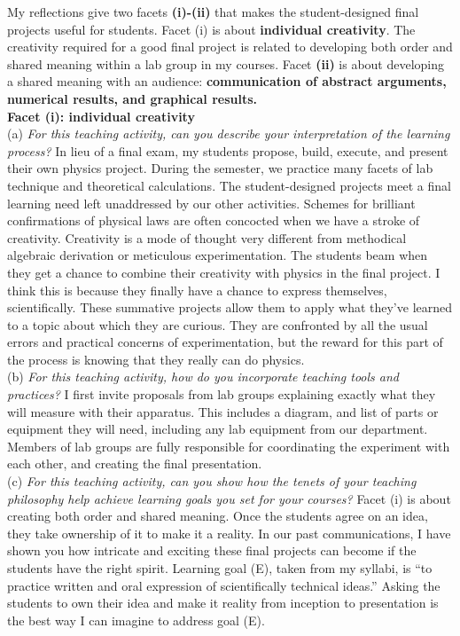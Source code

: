 \documentclass[../../../main.tex]{subfiles}
\begin{document}
My reflections give two facets \textbf{(i)-(ii)} that makes the student-designed final projects useful for students.  Facet (i) is about \textbf{individual creativity}.  The creativity required for a good final project is related to developing both order and shared meaning within a lab group in my courses.  Facet \textbf{(ii)} is about developing a shared meaning with an audience: \textbf{communication of abstract arguments, numerical results, and graphical results.}
\\
\vspace{0.25cm}
\textbf{Facet (i): individual creativity}
\\
\vspace{0.25cm}
(a) \textit{For this teaching activity, can you describe your interpretation of the learning process?} In lieu of a final exam, my students propose, build, execute, and present their own physics project.  During the semester, we practice many facets of lab technique and theoretical calculations.  The student-designed projects meet a final learning need left unaddressed by our other activities.  Schemes for brilliant confirmations of physical laws are often concocted when we have a stroke of creativity. Creativity is a mode of thought very different from methodical algebraic derivation or meticulous experimentation.  The students beam when they get a chance to combine their creativity with physics in the final project.  I think this is because they finally have a chance to express themselves, scientifically.  These summative projects allow them to apply what they've learned to a topic about which they are curious.  They are confronted by all the usual errors and practical concerns of experimentation, but the reward for this part of the process is knowing that they really can do physics. 
\\
\vspace{0.25cm}
(b) \textit{For this teaching activity, how do you incorporate teaching tools and practices?}  I first invite proposals from lab groups explaining exactly what they will measure with their apparatus.  This includes a diagram, and list of parts or equipment they will need, including any lab equipment from our department.  Members of lab groups are fully responsible for coordinating the experiment with each other, and creating the final presentation.
\\
\vspace{0.25cm}
(c) \textit{For this teaching activity, can you show how the tenets of your teaching philosophy help achieve learning goals you
set for your courses?} Facet (i) is about creating both order and shared meaning.  Once the students agree on an idea, they take ownership of it to make it a reality.  In our past communications, I have shown you how intricate and exciting these final projects can become if the students have the right spirit.  Learning goal (E), taken from my syllabi, is ``to practice written and oral expression of scientifically technical ideas.''  Asking the students to own their idea and make it reality from inception to presentation is the best way I can imagine to address goal (E).
\end{document}
